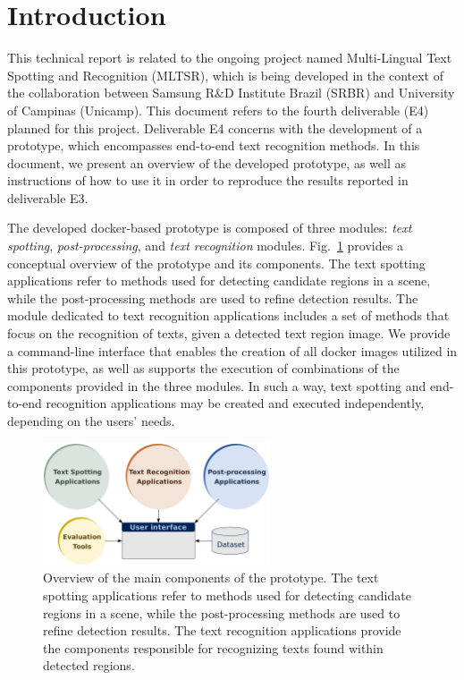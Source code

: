 \section{Introduction}
\label{sec:introduction}

This technical report is related to the ongoing project named Multi-Lingual Text Spotting and Recognition (MLTSR), which is being developed in the context of the collaboration between Samsung R\&D Institute Brazil (SRBR) and University of Campinas (Unicamp). This document refers to the fourth deliverable (E4) planned for this project. Deliverable E4 concerns with the development of a prototype, which encompasses end-to-end text recognition methods. In this document, we present an overview of the developed prototype, as well as instructions of how to use it in order to reproduce the results reported in deliverable E3.

The developed docker-based prototype is composed of three modules: \textit{text spotting}, \textit{post-processing}, and \textit{text recognition} modules. Fig.~\ref{fig:prototype-overview-simple} provides a conceptual overview of the prototype and its components. The text spotting applications refer to methods used for detecting candidate regions in a scene, while the post-processing methods are used to refine detection results. The module dedicated to text recognition applications includes a set of methods that focus on the recognition of texts, given a detected text region image. We provide a command-line interface that enables the creation of all docker images utilized in this prototype, as well as supports the execution of combinations of the components provided in the three modules. In such a way, text spotting and end-to-end recognition applications may be created and executed independently, depending on the users' needs.
%
\begin{figure}
    \centering
    \includegraphics[width=0.6\textwidth]{figs/prototype-overview-simple.pdf}
    \caption{Overview of the main components of the prototype. The text spotting applications refer to methods used for detecting candidate regions in a scene, while the post-processing methods are used to refine detection results. The text recognition applications provide the components responsible for recognizing texts found within detected regions.}
    \label{fig:prototype-overview-simple}
\end{figure}


